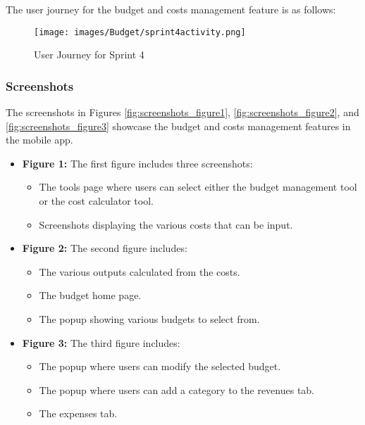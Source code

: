 The user journey for the budget and costs management feature is as follows:

\begin{figure}[H]
    \centering
    \texttt{[image: images/Budget/sprint4activity.png]}
    \caption{User Journey for Sprint 4}
    \label{fig:activity_sprint4}
\end{figure}

\subsubsection{Screenshots}

The screenshots in Figures \ref{fig:screenshots_figure1}, \ref{fig:screenshots_figure2}, and \ref{fig:screenshots_figure3} showcase the budget and costs management features in the mobile app.

\begin{itemize}
    \item \textbf{Figure 1:} The first figure includes three screenshots:
    \begin{itemize}
        \item The tools page where users can select either the budget management tool or the cost calculator tool.
        \item Screenshots displaying the various costs that can be input.
    \end{itemize}
    
    \item \textbf{Figure 2:} The second figure includes:
    \begin{itemize}
        \item The various outputs calculated from the costs.
        \item The budget home page.
        \item The popup showing various budgets to select from.
    \end{itemize}
    
    \item \textbf{Figure 3:} The third figure includes:
    \begin{itemize}
        \item The popup where users can modify the selected budget.
        \item The popup where users can add a category to the revenues tab.
        \item The expenses tab.
    \end{itemize}
\end{itemize}

